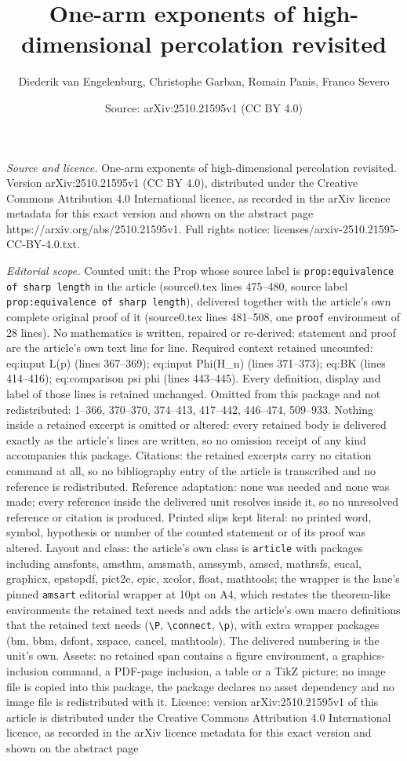 \documentclass[10pt,a4paper]{amsart}
\title[One-arm exponents of high-dimensional percolation revisited]{One-arm exponents of high-dimensional percolation revisited}
\author{Diederik van Engelenburg, Christophe Garban, Romain Panis, Franco Severo}
\date{Source: arXiv:2510.21595v1 (CC BY 4.0)}
\begin{document}
\maketitle

\noindent\emph{Source and licence.} One-arm exponents of high-dimensional percolation revisited. Version arXiv:2510.21595v1 (CC BY 4.0), distributed under the Creative Commons Attribution 4.0 International licence, as recorded in the arXiv licence metadata for this exact version and shown on the abstract page https://arxiv.org/abs/2510.21595v1. Full rights notice: licenses/arxiv-2510.21595-CC-BY-4.0.txt.\par\smallskip

\noindent\textit{Editorial scope.} Counted unit: the Prop whose source label is \texttt{prop:equivalence of sharp length} in the article (source0.tex lines 475--480, source label \texttt{prop:equivalence of sharp length}), delivered together with the article's own complete original proof of it (source0.tex lines 481--508, one \texttt{proof} environment of 28 lines). No mathematics is written, repaired or re-derived: statement and proof are the article's own text line for line. Required context retained uncounted: eq:input L(p) (lines 367--369); eq:input Phi(H\_n) (lines 371--373); eq:BK (lines 414--416); eq:comparison psi phi (lines 443--445). Every definition, display and label of those lines is retained unchanged. Omitted from this package and not redistributed: 1--366, 370--370, 374--413, 417--442, 446--474, 509--933. Nothing inside a retained excerpt is omitted or altered: every retained body is delivered exactly as the article's lines are written, so no omission receipt of any kind accompanies this package. Citations: the retained excerpts carry no citation command at all, so no bibliography entry of the article is transcribed and no reference is redistributed. Reference adaptation: none was needed and none was made; every reference inside the delivered unit resolves inside it, so no unresolved reference or citation is produced. Printed slips kept literal: no printed word, symbol, hypothesis or number of the counted statement or of its proof was altered. Layout and class: the article's own class is \texttt{article} with packages including amsfonts, amsthm, amsmath, amssymb, amscd, mathrsfs, eucal, graphicx, epstopdf, pict2e, epic, xcolor, float, mathtools; the wrapper is the lane's pinned \texttt{amsart} editorial wrapper at 10pt on A4, which restates the theorem-like environments the retained text needs and adds the article's own macro definitions that the retained text needs (\texttt{\textbackslash P}, \texttt{\textbackslash connect}, \texttt{\textbackslash p}), with extra wrapper packages (bm, bbm, dsfont, xspace, cancel, mathtools). The delivered numbering is the unit's own. Assets: no retained span contains a figure environment, a graphics-inclusion command, a PDF-page inclusion, a table or a TikZ picture; no image file is copied into this package, the package declares no asset dependency and no image file is redistributed with it. Licence: version arXiv:2510.21595v1 of this article is distributed under the Creative Commons Attribution 4.0 International licence, as recorded in the arXiv licence metadata for this exact version and shown on the abstract page 
\end{document}
